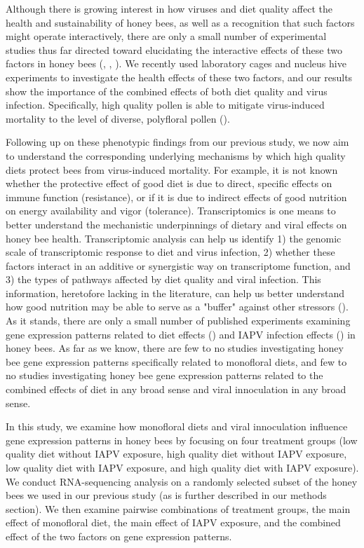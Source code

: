 \documentclass[11pt,a4paper,oldfontcommands,openany]{memoir}
\numberwithin{equation}{section} %
\begin{document}
Although there is growing interest in how viruses and diet quality affect the health and sustainability of honey bees, as well as a recognition that such factors might operate interactively, there are only a small number of experimental studies thus far directed toward elucidating the interactive effects of these two factors in honey bees (\citealt{intNV}, \citealt{intNV2}, \citealt{intNV3}). We recently used laboratory cages and nucleus hive experiments to investigate the health effects of these two factors, and our results show the importance of the combined effects of both diet quality and virus infection. Specifically, high quality pollen is able to mitigate virus-induced mortality to the level of diverse, polyfloral pollen (\citealt{adamInt}). 

Following up on these phenotypic findings from our previous study, we now aim to understand the corresponding underlying mechanisms by which high quality diets protect bees from virus-induced mortality. For example, it is not known whether the protective effect of good diet is due to direct, specific effects on immune function (resistance), or if it is due to indirect effects of good nutrition on energy availability and vigor (tolerance). Transcriptomics is one means to better understand the mechanistic underpinnings of dietary and viral effects on honey bee health. Transcriptomic analysis can help us identify 1) the genomic scale of transcriptomic response to diet and virus infection, 2) whether these factors interact in an additive or synergistic way on transcriptome function, and 3) the types of pathways affected by diet quality and viral infection. This information, heretofore lacking in the literature, can help us better understand how good nutrition may be able to serve as a "buffer" against other stressors (\citealt{AdamTothReview}). As it stands, there are only a small number of published experiments examining gene expression patterns related to diet effects (\citealt{alaux2}) and IAPV infection effects (\citealt{galbraith}) in honey bees. As far as we know, there are few to no studies investigating honey bee gene expression patterns specifically related to monofloral diets, and few to no studies investigating honey bee gene expression patterns related to the combined effects of diet in any broad sense and viral innoculation in any broad sense. 

In this study, we examine how monofloral diets and viral innoculation influence gene expression patterns in honey bees by focusing on four treatment groups (low quality diet without IAPV exposure, high quality diet without IAPV exposure, low quality diet with IAPV exposure, and high quality diet with IAPV exposure). We conduct RNA-sequencing analysis on a randomly selected subset of the honey bees we used in our previous study (as is further described in our methods section). We then examine pairwise combinations of treatment groups, the main effect of monofloral diet, the main effect of IAPV exposure, and the combined effect of the two factors on gene expression patterns.
\end{document}
